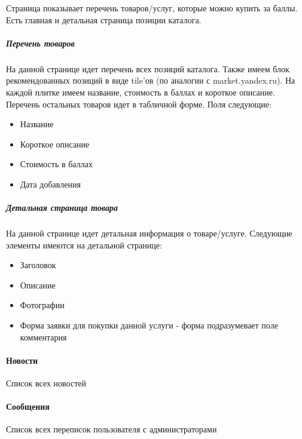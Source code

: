 \documentclass[DIV=calc, paper=a4, fontsize=11pt]{scrartcl} %
\begin{document}
Страница показывает перечень товаров/услуг, которые можно купить за баллы. Есть главная и детальная страница позиции каталога.

\subparagraph{Перечень товаров}
На данной странице идет перечень всех позиций каталога.
Также имеем блок рекомендованных позиций в виде tile'ов (по аналогии с market.yandex.ru). На каждой плитке имеем название, стоимость в баллах и короткое описание.
\\[0.5cm]
Перечень остальных товаров идет в табличной форме. Поля следующие:

\begin{itemize}
	\item Название
	\item Короткое описание
	\item Стоимость в баллах
	\item Дата добавления
\end{itemize}

\subparagraph{Детальная страница товара}
На данной странице идет детальная информация о товаре/услуге. Следующие элементы имеются на детальной странице:

\begin{itemize}
	\item Заголовок
	\item Описание
	\item Фотографии
	\item Форма заявки для покупки данной услуги - форма подразумевает поле комментария
\end{itemize}

\paragraph{Новости}
Список всех новостей

\paragraph{Сообщения}
Список всех переписок пользователя с администраторами
\end{document}
